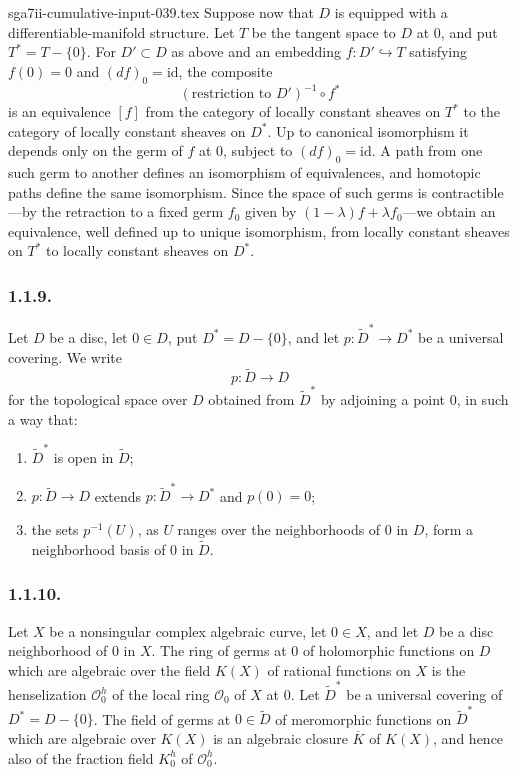 \begin{filecontents*}{sga7ii-cumulative-input-039.tex}
Suppose now that $D$ is equipped with a differentiable-manifold
structure.  Let $T$ be the tangent space to $D$ at $0$, and put
$T^*=T-\{0\}$.  For $D'\subset D$ as above and an embedding
$f:D'\hookrightarrow T$ satisfying $f(0)=0$ and $(df)_0=\mathrm{id}$,
the composite
\[
(\text{restriction to }D')^{-1}\circ f^*
\]
is an equivalence $[f]$ from the category of locally constant sheaves
on $T^*$ to the category of locally constant sheaves on $D^*$.
Up to canonical isomorphism it depends only on the germ of $f$ at
$0$, subject to $(df)_0=\mathrm{id}$.  A path from one such germ to
another defines an isomorphism of equivalences, and homotopic paths
define the same isomorphism.  Since the space of such germs is
contractible---by the retraction to a fixed germ $f_0$ given by
$(1-\lambda)f+\lambda f_0$---we obtain an equivalence, well defined
up to unique isomorphism, from locally constant sheaves on $T^*$ to
locally constant sheaves on $D^*$.

\subsubsection*{1.1.9.}
Let $D$ be a disc, let $0\in D$, put $D^*=D-\{0\}$, and let
$p:\widetilde D^*\longrightarrow D^*$ be a universal covering.  We
write
\[
p:\widetilde D\longrightarrow D
\]
for the topological space over $D$ obtained from
$\widetilde D^*$ by adjoining a point $0$, in such a way that:
\begin{enumerate}[label=(\alph*),leftmargin=2.6em]
\item $\widetilde D^*$ is open in $\widetilde D$;
\item $p:\widetilde D\longrightarrow D$ extends
  $p:\widetilde D^*\longrightarrow D^*$ and $p(0)=0$;
\item the sets $p^{-1}(U)$, as $U$ ranges over the neighborhoods of
  $0$ in $D$, form a neighborhood basis of $0$ in $\widetilde D$.
\end{enumerate}

\subsubsection*{1.1.10.}
Let $X$ be a nonsingular complex algebraic curve, let $0\in X$, and
let $D$ be a disc neighborhood of $0$ in $X$.  The ring of germs at
$0$ of holomorphic functions on $D$ which are algebraic over the
field $K(X)$ of rational functions on $X$ is the henselization
$\mathcal O_0^h$ of the local ring $\mathcal O_0$ of $X$ at $0$.
Let $\widetilde D^*$ be a universal covering of
$D^*=D-\{0\}$.  The field of germs at $0\in\widetilde D$ of
meromorphic functions on $\widetilde D^*$ which are algebraic over
$K(X)$ is an algebraic closure $\overline K$ of $K(X)$, and hence
also of the fraction field $K_0^h$ of $\mathcal O_0^h$.


\end{filecontents*}
